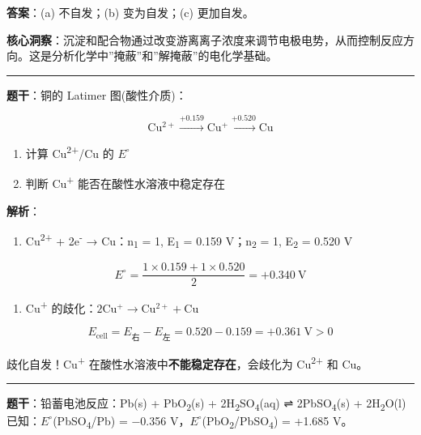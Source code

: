 \documentclass[a4paper,11pt]{ctexart}
\providecommand{\tightlist}{\setlength{\itemsep}{0pt}\setlength{\parskip}{0pt}}
\begin{document}
\textbf{答案}：(a) 不自发；(b) 变为自发；(c) 更加自发。

\textbf{核心洞察}：沉淀和配合物通过改变游离离子浓度来调节电极电势，从而控制反应方向。这是分析化学中''掩蔽''和''解掩蔽''的电化学基础。

\begin{center}\rule{0.5\linewidth}{0.5pt}\end{center}

\textbf{题干}：铜的 Latimer 图(酸性介质)：

\[\mathrm{Cu^{2+}} \xrightarrow{+0.159} \mathrm{Cu^+} \xrightarrow{+0.520} \mathrm{Cu}\]

\begin{enumerate}
\def\labelenumi{(\alph{enumi})}
\tightlist
\item
  计算 Cu\textsuperscript{2+}/Cu 的 \(E^{\circ}\)
\item
  判断 Cu\textsuperscript{+} 能否在酸性水溶液中稳定存在
\end{enumerate}

\textbf{解析}：

\begin{enumerate}
\def\labelenumi{(\alph{enumi})}
\tightlist
\item
  Cu\textsuperscript{2+} + 2e\textsuperscript{-} → Cu：n\textsubscript{1} = 1, E\textsubscript{1} = 0.159 V；n\textsubscript{2} = 1, E\textsubscript{2} = 0.520 V
\end{enumerate}

\[E^\circ = \frac{1 \times 0.159 + 1 \times 0.520}{2} = +0.340\ \mathrm{V}\]

\begin{enumerate}
\def\labelenumi{(\alph{enumi})}
\setcounter{enumi}{1}
\tightlist
\item
  Cu\textsuperscript{+} 的歧化：\(2\mathrm{Cu^+ \to Cu^{2+} + Cu}\)
\end{enumerate}

\[E_{\text{cell}} = E_{\text{右}} - E_{\text{左}} = 0.520 - 0.159 = +0.361\ \mathrm{V} > 0\]

歧化自发！Cu\textsuperscript{+} 在酸性水溶液中\textbf{不能稳定存在}，会歧化为 Cu\textsuperscript{2+} 和 Cu。

\begin{center}\rule{0.5\linewidth}{0.5pt}\end{center}

\textbf{题干}：铅蓄电池反应：Pb(s) + PbO\textsubscript{2}(s) + 2H\textsubscript{2}SO\textsubscript{4}(aq) ⇌ 2PbSO\textsubscript{4}(s) + 2H\textsubscript{2}O(l)
已知：\(E^{\circ}\)(PbSO\textsubscript{4}/Pb) = −0.356 V，\(E^{\circ}\)(PbO\textsubscript{2}/PbSO\textsubscript{4}) = +1.685 V。
\end{document}
